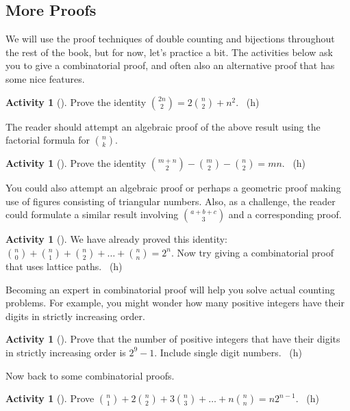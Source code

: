 \documentclass[10pt,]{book}
\theoremstyle{plain}
\theoremstyle{definition}
\theoremstyle{definition}
\theoremstyle{definition}
\newtheorem{activity}[project]{Activity}
\numberwithin{equation}{chapter}
\begin{document}
\subsection[{More Proofs}]{More Proofs}\label{subsec-moreproofs}
\hypertarget{p-675}{}%
We will use the proof techniques of double counting and bijections throughout the rest of the book, but for now, let's practice a bit.  The activities below ask you to give a combinatorial proof, and often also an alternative proof that has some nice features.%
\begin{activity}[]\label{act-redgreenballs}
\hypertarget{p-676}{}%
Prove the identity \(\binom{2n}{2} = 2 \binom{n}{2} + n^{2}\).%
~{\tiny (h)}\end{activity}
\hypertarget{p-680}{}%
The reader should attempt an algebraic proof of the above result using the factorial formula for \(\binom{n}{k}\).%
\begin{activity}[]\label{act-bowtiefez}
\hypertarget{p-681}{}%
Prove the identity \(\binom{m + n}{2} - \binom{m}{2} - \binom{n}{2} = mn\).%
~{\tiny (h)}\end{activity}
\hypertarget{p-684}{}%
You could also attempt an algebraic proof or perhaps a geometric proof making use of figures consisting of triangular numbers. Also, as a challenge, the reader could formulate a similar result involving \(\binom{a + b + c}{3}\) and a corresponding proof.%
\begin{activity}[]\label{activity-89}
\hypertarget{p-685}{}%
We have already proved this identity: \(\binom{n}{0} + \binom{n}{1} + \binom{n}{2} + \ldots + \binom{n}{n} = 2^{n}\).  Now try giving a combinatorial proof that uses lattice paths.%
~{\tiny (h)}\end{activity}
\hypertarget{p-688}{}%
Becoming an expert in combinatorial proof will help you solve actual counting problems.  For example, you might wonder how many positive integers have their digits in strictly increasing order.%
\begin{activity}[]\label{activity-90}
\hypertarget{p-689}{}%
Prove that the number of positive integers that have their digits in strictly increasing order is \(2^{9} - 1\). Include single digit numbers.%
~{\tiny (h)}\end{activity}
\hypertarget{p-693}{}%
Now back to some combinatorial proofs.%
\begin{activity}[]\label{act_anysizecommittee}
\hypertarget{p-694}{}%
Prove \(\binom{n}{1} + 2 \binom{n}{2} + 3 \binom{n}{3} + \ldots + n \binom{n}{n} = n2^{n - 1}\).%
~{\tiny (h)}\end{activity}
\end{document}
